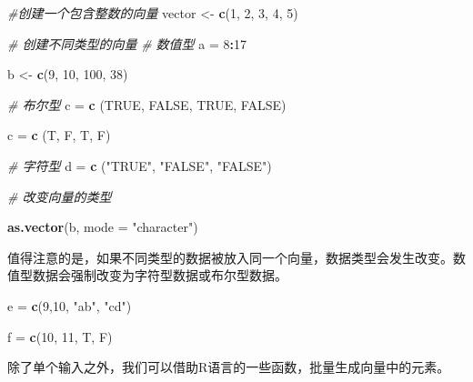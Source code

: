 \documentclass[]{book}
\newenvironment{Shaded}{\begin{snugshade}}{\end{snugshade}}
\newcommand{\CommentTok}[1]{\textcolor[rgb]{0.56,0.35,0.01}{\textit{#1}}}
\newcommand{\DataTypeTok}[1]{\textcolor[rgb]{0.13,0.29,0.53}{#1}}
\newcommand{\DecValTok}[1]{\textcolor[rgb]{0.00,0.00,0.81}{#1}}
\newcommand{\KeywordTok}[1]{\textcolor[rgb]{0.13,0.29,0.53}{\textbf{#1}}}
\newcommand{\NormalTok}[1]{#1}
\newcommand{\OperatorTok}[1]{\textcolor[rgb]{0.81,0.36,0.00}{\textbf{#1}}}
\newcommand{\OtherTok}[1]{\textcolor[rgb]{0.56,0.35,0.01}{#1}}
\newcommand{\StringTok}[1]{\textcolor[rgb]{0.31,0.60,0.02}{#1}}
\begin{document}
\begin{Shaded}
\begin{Highlighting}[]
\CommentTok{#创建一个包含整数的向量}
\NormalTok{vector <-}\StringTok{ }\KeywordTok{c}\NormalTok{(}\DecValTok{1}\NormalTok{, }\DecValTok{2}\NormalTok{, }\DecValTok{3}\NormalTok{, }\DecValTok{4}\NormalTok{, }\DecValTok{5}\NormalTok{)}

\CommentTok{# 创建不同类型的向量}
\CommentTok{# 数值型}
\NormalTok{a =}\StringTok{ }\DecValTok{8}\OperatorTok{:}\DecValTok{17}

\NormalTok{b <-}\StringTok{ }\KeywordTok{c}\NormalTok{(}\DecValTok{9}\NormalTok{, }\DecValTok{10}\NormalTok{, }\DecValTok{100}\NormalTok{, }\DecValTok{38}\NormalTok{)}

\CommentTok{# 布尔型}
\NormalTok{c =}\StringTok{ }\KeywordTok{c}\NormalTok{ (}\OtherTok{TRUE}\NormalTok{, }\OtherTok{FALSE}\NormalTok{, }\OtherTok{TRUE}\NormalTok{, }\OtherTok{FALSE}\NormalTok{)}

\NormalTok{c =}\StringTok{ }\KeywordTok{c}\NormalTok{ (T, F, T, F)}

\CommentTok{# 字符型}
\NormalTok{d =}\StringTok{ }\KeywordTok{c}\NormalTok{ (}\StringTok{"TRUE"}\NormalTok{, }\StringTok{"FALSE"}\NormalTok{, }\StringTok{"FALSE"}\NormalTok{)}

\CommentTok{# 改变向量的类型}

\KeywordTok{as.vector}\NormalTok{(b, }\DataTypeTok{mode =} \StringTok{"character"}\NormalTok{)}
\end{Highlighting}
\end{Shaded}

值得注意的是，如果不同类型的数据被放入同一个向量，数据类型会发生改变。数值型数据会强制改变为字符型数据或布尔型数据。

\begin{Shaded}
\begin{Highlighting}[]
\NormalTok{e =}\StringTok{ }\KeywordTok{c}\NormalTok{(}\DecValTok{9}\NormalTok{,}\DecValTok{10}\NormalTok{, }\StringTok{"ab"}\NormalTok{, }\StringTok{"cd"}\NormalTok{)}

\NormalTok{f =}\StringTok{ }\KeywordTok{c}\NormalTok{(}\DecValTok{10}\NormalTok{, }\DecValTok{11}\NormalTok{, T, F)}
\end{Highlighting}
\end{Shaded}

除了单个输入之外，我们可以借助R语言的一些函数，批量生成向量中的元素。
\end{document}
